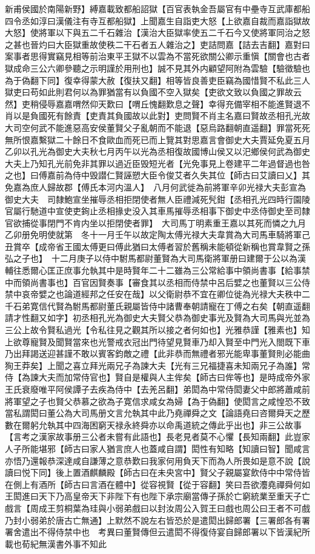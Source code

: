 新甫侯國於南陽新野】縛嘉載致都船詔獄【百官表執金吾屬官有中壘寺互武庫都船四令丞如淳曰漢儀注有寺互都船獄】上聞嘉生自詣吏大怒【上欲嘉自裁而嘉詣獄故大怒】使將軍以下與五二千石雜治【漢治大臣獄率使五二千石今又使將軍同治之怒之甚也晉灼曰大臣獄重故使秩二干石者五人雜治之】吏詰問嘉【詰去吉翻】嘉對曰案事者思得實竊見相等前治東平王獄不以雲為不當死欲關公卿示重愼【關會也古者獄成命三公六卿參聽之示明謹於用刑也】誠不見其外内顧望阿附為雲驗【驗徵驗也為于偽翻下同】復幸得蒙大赦【復扶又翻】相等皆良善吏臣竊為國惜賢不私此三人獄吏曰苟如此則君何以為罪猶當有以負國不空入獄矣【吏欲文致以負國之罪故云然】吏稍侵辱嘉嘉喟然仰天歎曰【喟丘愧翻歎息之聲】幸得充備宰相不能進賢退不肖以是負國死有餘責【吏責其負國故以此對】吏問賢不肖主名嘉曰賢故丞相孔光故大司空何武不能進惡高安侯董賢父子亂朝而不能退【惡烏路翻朝直遥翻】罪當死死無所恨嘉繫獄二十餘日不食歐血而死已而上覽其對思嘉言會御史大夫賈延免夏五月乙卯以孔光為御史大夫秋七月丙午以光為丞相復故國博山侯又以汜鄉侯何武為御史大夫上乃知孔光前免非其罪以過近臣毁短光者【光免事見上卷建平二年過督過也咎之也】曰傅嘉前為侍中毁譛仁賢誣愬大臣令俊艾者久失其位【師古曰艾讀曰乂】其免嘉為庶人歸故郡【傅氏本河内溫人】　八月何武徙為前將軍辛卯光禄大夫彭宣為御史大夫　司隸鮑宣坐摧辱丞相拒閉使者無人臣禮減死髠鉗【丞相孔光四時行園陵官屬行馳道中宣使吏銁止丞相掾史没入其車馬摧辱丞相事下御史中丞侍御史至司隸官欲捕從事閉門不肯内坐以拒閉使者罪】　大司馬丁明素重王嘉以其死而憐之九月乙卯册免明使就第　冬十一月壬午以故定陶太傅光禄大夫韋賞為大司馬車騎將軍己丑賞卒【成帝省王國太傅更曰傅此猶曰太傅者習於舊稱未能頓從新稱也賞韋賢之孫弘之子也】　十二月庚子以侍中駙馬都尉董賢為大司馬衛將軍册曰建爾于公以為漢輔往悉爾心匡正庶事允執其中是時賢年二十二雖為三公常給事中領尚書事【給事禁中而領尚書事也】百官因賢奏事【審食其以丞相而侍禁中呂后嬖之也董賢以三公侍禁中哀帝嬖之也論道經邦之任安在哉】以父衛尉恭不宜在卿位徙為光禄大夫秩中二千石弟寛信代賢為駙馬都尉董氏親屬皆侍中諸曹奉朝請寵在丁傅之右矣【朝直遥翻請才性翻又如字】初丞相孔光為御史大夫賢父恭為御史事光及賢為大司馬與光並為三公上故令賢私過光【令私往見之觀其所以接之者何如也】光雅恭謹【雅素也】知上欲尊寵賢及聞賢當來也光警戒衣冠出門待望見賢車乃却入賢至中門光入閤既下車乃出拜謁送迎甚謹不敢以賓客鈞敵之禮【此非恭而無禮者邪光能卑事董賢則必能曲狥王莽矣】上聞之喜立拜光兩兄子為諫大夫【光有三兄福捷喜未知兩兄子為誰】常侍【為諫大夫而加常侍官也】賢自是權與人主侔矣【師古曰侔等也】是時成帝外家王氏衰廢唯平阿侯譚子去疾為侍中【去羌呂翻】弟閎為中常侍閎妻父中郎將蕭咸前將軍望之子也賢父恭慕之欲為子寛信求咸女為婦【為于偽翻】使閎言之咸惶恐不致當私謂閎曰董公為大司馬册文言允執其中此乃堯禪舜之文【論語堯曰咨爾舜天之歷數在爾躬允執其中四海困窮天禄永終舜亦以命禹道統之傳此乎出也】非三公故事【言考之漢家故事册三公者未嘗有此語也】長老見者莫不心懼【長知兩翻】此豈家人子所能堪邪【師古曰家人猶言庶人也蓋咸自謂】閎性有知略【知讀曰智】聞咸言亦悟乃還報恭深達咸自謙薄之意恭歎曰我家何用負天下而為人所畏如是意不說【說讀曰悦下同】後上置酒麒麟殿【師古曰在未央宮中】賢父子親屬宴飲侍中中常侍皆在側上有酒所【師古曰言酒在體中】從容視賢【從于容翻】笑曰吾欲灋堯禪舜何如王閎進曰天下乃高皇帝天下非陛下有也陛下承宗廟當傳子孫於亡窮統業至重天子亡戲言【周成王剪桐葉為珪與小弱弟戲曰以封汝周公入賀王曰戲也周公曰王者不可戲乃封小弱弟於唐古亡無通】上默然不說左右皆恐於是遣閎出歸郎署【三署郎各有署署舍遣出不得侍禁中也　考異曰董賢傳但云遣閎不得復侍宴自歸郎署以下皆漢紀所載也荀紀無漢書外事不知此
